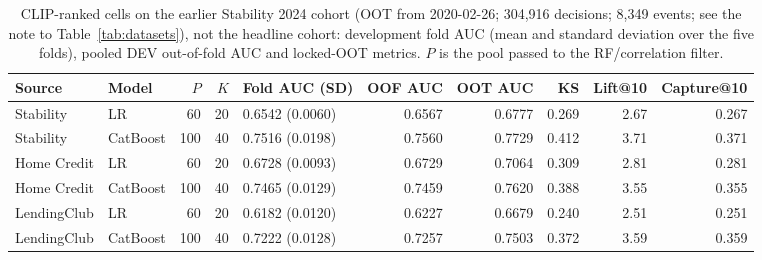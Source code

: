 \documentclass[final,5p,twocolumn]{elsarticle}
\newcommand{\Kfeat}{K}
\begin{document}
\begin{table}[htbp]
\centering
\footnotesize
\begin{threeparttable}
\caption{CLIP-ranked cells on the earlier Stability 2024 cohort (OOT from 2020-02-26; 304,916 decisions; 8,349 events; see the note to Table~\ref{tab:datasets}), not the headline cohort: development fold AUC (mean and standard deviation over the five folds), pooled DEV out-of-fold AUC and locked-OOT metrics. $P$ is the pool passed to the RF/correlation filter.}
\label{tab:clip_cells}
\begin{tabular}{@{}llrrlrrrrr@{}}
\toprule
Source & Model & $P$ & $\Kfeat$ & Fold AUC (SD) & OOF AUC & OOT AUC & KS & Lift@10 & Capture@10 \\
\midrule
Stability & LR & 60 & 20 & 0.6542 (0.0060) & 0.6567 & 0.6777 & 0.269 & 2.67 & 0.267 \\
Stability & CatBoost & 100 & 40 & 0.7516 (0.0198) & 0.7560 & 0.7729 & 0.412 & 3.71 & 0.371 \\
Home Credit & LR & 60 & 20 & 0.6728 (0.0093) & 0.6729 & 0.7064 & 0.309 & 2.81 & 0.281 \\
Home Credit & CatBoost & 100 & 40 & 0.7465 (0.0129) & 0.7459 & 0.7620 & 0.388 & 3.55 & 0.355 \\
LendingClub & LR & 60 & 20 & 0.6182 (0.0120) & 0.6227 & 0.6679 & 0.240 & 2.51 & 0.251 \\
LendingClub & CatBoost & 100 & 40 & 0.7222 (0.0128) & 0.7257 & 0.7503 & 0.372 & 3.59 & 0.359 \\
\bottomrule
\end{tabular}
\end{threeparttable}
\end{table}
\end{document}
